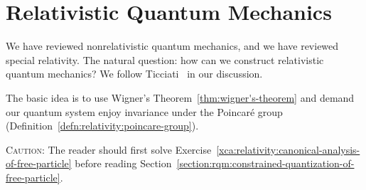 \chapter{Relativistic Quantum Mechanics}

\M
We have reviewed nonrelativistic quantum mechanics, and we have
reviewed special relativity. The natural question: how can we construct
relativistic quantum mechanics? We follow
Ticciati~\cite{Ticciati:1999qp} in our discussion.

The basic idea is to use Wigner's Theorem~\ref{thm:wigner's-theorem}
and demand our quantum system enjoy invariance under the Poincar\'e group
(Definition~\ref{defn:relativity:poincare-group}).

\textsc{Caution:}
The reader should first solve
Exercise~\ref{xca:relativity:canonical-analysis-of-free-particle} before
reading Section~\ref{section:rqm:constrained-quantization-of-free-particle}.

